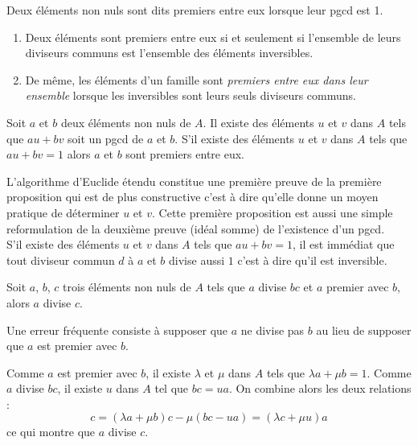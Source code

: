  
\begin{defi}
 Deux éléments non nuls sont dits premiers entre eux lorsque leur pgcd est 1.
\end{defi}
\begin{rems}
\begin{enumerate}
 \item Deux éléments sont premiers entre eux si et seulement si l'ensemble de leurs diviseurs communs est l'ensemble des éléments inversibles.
 \item {} De même, les éléments d'un famille sont \emph{premiers entre eux dans leur ensemble} lorsque les inversibles sont leurs seuls diviseurs communs.
\end{enumerate} 
\end{rems}
\begin{thm}[de Bezout]
 Soit $a$ et $b$ deux éléments non nuls de $A$.\newline
Il existe des éléments $u$ et $v$ dans $A$ tels que $au+bv$ soit un pgcd de $a$ et $b$. S'il existe des éléments $u$ et $v$ dans $A$ tels que $au+bv=1$ alors $a$ et $b$ sont premiers entre eux.
\end{thm}
\begin{demo}
 L'algorithme d'Euclide étendu constitue une première preuve de la première proposition qui est de plus constructive c'est à dire qu'elle donne un moyen pratique de déterminer $u$ et $v$. Cette première proposition est aussi une simple reformulation de la deuxième preuve (idéal somme) de l'existence d'un pgcd.\\
 S'il existe des éléments $u$ et $v$ dans $A$ tels que $au+bv=1$, il est immédiat que tout diviseur commun $d$ à $a$ et $b$ divise aussi $1$ c'est à dire qu'il est inversible.
\end{demo}

\begin{thm}[de Gauss]
 Soit $a$, $b$, $c$ trois éléments non nuls de $A$ tels que $a$ divise $bc$ et $a$ premier avec $b$, alors $a$ divise $c$.
\end{thm}
\begin{rem}
 Une erreur fréquente consiste à supposer que $a$ ne divise pas $b$ au lieu de supposer que $a$ est premier avec $b$.
\end{rem}
\begin{demo}
 Comme $a$ est premier avec $b$, il existe $\lambda$ et $\mu$ dans $A$ tels que $\lambda a + \mu b=1$. Comme $a$ divise $bc$, il existe $u$ dans $A$ tel que $bc=ua$. On combine alors les deux relations :
\begin{displaymath}
 c=(\lambda a +\mu b)c - \mu(bc-ua)=(\lambda c +\mu u)a
\end{displaymath}
ce qui montre que $a$ divise $c$.
\end{demo}

